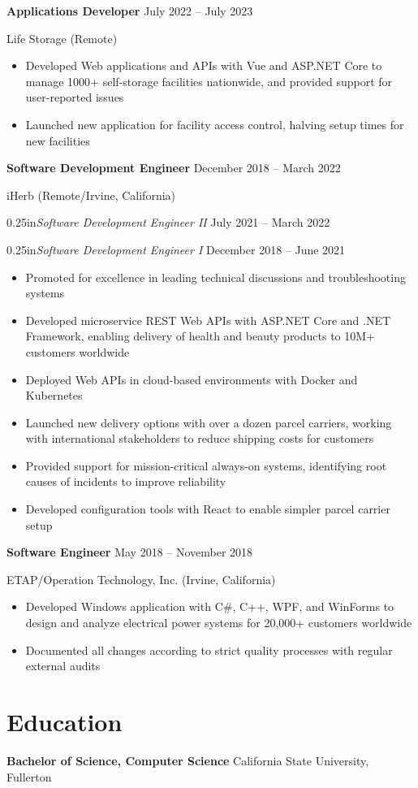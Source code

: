 \documentclass[12pt]{article}
\newcommand{\titleheader}[2]{\textbf{#1} \symbol{"B7} #2}
\newcommand{\secondaryheader}[2]{\begin{adjustwidth}{0.25in}{}\textit{#1} \symbol{"B7} #2\end{adjustwidth}}
\newcommand{\locheader}[2]{#1 (#2)}
\begin{document}
	\titleheader{Applications Developer}{July 2022 -- July 2023}

	\locheader{Life Storage}{Remote}

	\begin{itemize}
		\item Developed Web applications and APIs with Vue and ASP.NET Core to manage 1000+ self-storage facilities nationwide, and provided support for user-reported issues
		\item Launched new application for facility access control, halving setup times for new facilities
	\end{itemize}

	\titleheader{Software Development Engineer}{December 2018 -- March 2022}

	\locheader{iHerb}{Remote/Irvine, California}

	\secondaryheader{Software Development Engineer II}{July 2021 -- March 2022}

	\secondaryheader{Software Development Engineer I}{December 2018 -- June 2021}

	\begin{itemize}
		\item Promoted for excellence in leading technical discussions and troubleshooting systems
		\item Developed microservice REST Web APIs with ASP.NET Core and .NET Framework, enabling delivery of health and beauty products to 10M+ customers worldwide
		\item Deployed Web APIs in cloud-based environments with Docker and Kubernetes
		\item Launched new delivery options with over a dozen parcel carriers, working with international stakeholders to reduce shipping costs for customers
		\item Provided support for mission-critical always-on systems, identifying root causes of incidents to improve reliability
		\item Developed configuration tools with React to enable simpler parcel carrier setup
	\end{itemize}

	\titleheader{Software Engineer}{May 2018 -- November 2018}

	\locheader{ETAP/Operation Technology, Inc.}{Irvine, California}

	\begin{itemize}
		\item Developed Windows application with C\#, C++, WPF, and WinForms to design and analyze electrical power systems for 20,000+ customers worldwide
		\item Documented all changes according to strict quality processes with regular external audits
	\end{itemize}

	\section*{Education}

	\textbf{Bachelor of Science, Computer Science}  California State University, Fullerton
\end{document}

